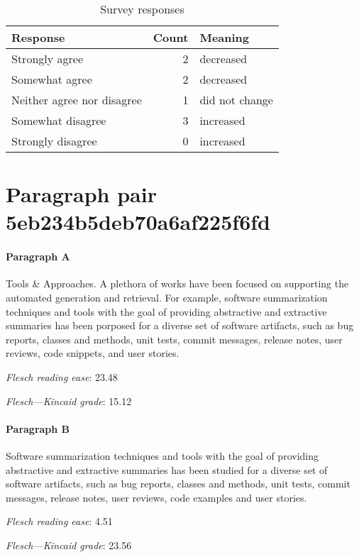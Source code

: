 \begin{table}[!h]
\centering
\begin{tabular}{lrl}
\toprule
          \textbf{Response} &  \textbf{Count} & \textbf{Meaning} \\
\midrule
             Strongly agree &               2 &        decreased \\
             Somewhat agree &               2 &        decreased \\
 Neither agree nor disagree &               1 &   did not change \\
          Somewhat disagree &               3 &        increased \\
          Strongly disagree &               0 &        increased \\
\bottomrule
\end{tabular}
\caption*{Survey responses}\end{table}


\newpage
\section{Paragraph pair 5eb234b5deb70a6af225f6fd}
\paragraph{Paragraph A}
Tools \& Approaches. A plethora of works have been focused on supporting the automated generation and retrieval. For example, software summarization techniques and tools with the goal of providing abstractive and extractive summaries has been porposed for a diverse set of software artifacts, such as bug reports, classes and methods, unit tests, commit messages, release notes, user reviews, code snippets, and user stories.\par\medskip
\emph{Flesch reading ease}: 23.48\par
\emph{Flesch---Kincaid grade}: 15.12

\paragraph{Paragraph B}
Software summarization techniques and tools with the goal of providing abstractive and extractive summaries has been studied for a diverse set of software artifacts, such as bug reports, classes and methods, unit tests, commit messages, release notes, user reviews, code examples and user stories.\par\medskip
\emph{Flesch reading ease}: 4.51\par
\emph{Flesch---Kincaid grade}: 23.56

